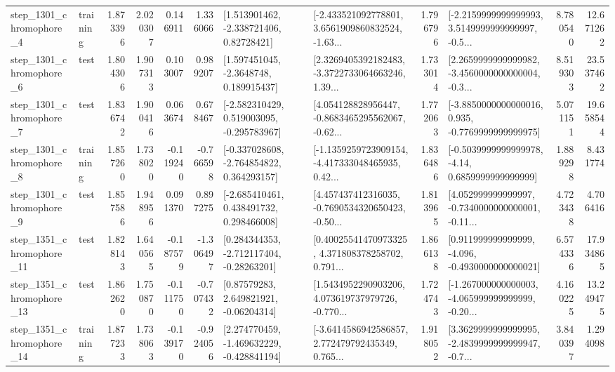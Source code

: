 \begin{tabular}{llrrrrllrlrr}
  step\_1301\_chromophore\_4 &  training &      1.873396 &    2.020307 &      0.146911 &  1.336066 &     [1.513901462, -2.338721406, 0.82728421] &  [-2.433521092778801, 3.6561909860832524, -1.63... &       1.796796 &  [-2.2159999999999993, 3.5149999999999997, -0.5... &            8.780540 &         12.671262 \\
  step\_1301\_chromophore\_6 &      test &      1.804306 &    1.907313 &      0.103007 &  0.989207 &      [1.597451045, -2.3648748, 0.189915437] &  [2.3269405392182483, -3.3722733064663246, 1.39... &       1.733014 &  [2.2659999999999982, -3.4560000000000004, -0.3... &            8.519303 &         23.537462 \\
  step\_1301\_chromophore\_7 &      test &      1.836742 &    1.900416 &      0.063674 &  0.678467 &   [-2.582310429, 0.519003095, -0.295783967] &  [4.054128828956447, -0.8683465295562067, -0.62... &       1.772063 &  [-3.8850000000000016, 0.935, -0.7769999999999975] &            5.071151 &         19.658544 \\
  step\_1301\_chromophore\_8 &  training &      1.857260 &    1.738020 &     -0.119240 & -0.766598 &   [-0.337028608, -2.764854822, 0.364293157] &  [-1.1359259723909154, -4.417333048465935, 0.42... &       1.836486 &   [-0.5039999999999978, -4.14, 0.6859999999999999] &            1.889298 &          8.431774 \\
  step\_1301\_chromophore\_9 &      test &      1.857586 &    1.948956 &      0.091370 &  0.897275 &    [-2.685410461, 0.438491732, 0.298466008] &  [4.457437412316035, -0.7690534320650423, -0.50... &       1.813965 &  [4.052999999999997, -0.7340000000000001, -0.11... &            4.723438 &          4.706416 \\
 step\_1351\_chromophore\_11 &      test &      1.828143 &    1.640565 &     -0.187579 & -1.306497 &    [0.284344353, -2.712117404, -0.28263201] &  [0.40025541470973325, 4.371808378258702, 0.791... &       1.866138 &   [0.911999999999999, -4.096, -0.4930000000000021] &            6.574336 &         17.934865 \\
 step\_1351\_chromophore\_13 &      test &      1.862620 &    1.750870 &     -0.111750 & -0.707432 &      [0.87579283, 2.649821921, -0.06204314] &  [1.5434952290903206, 4.073619737979726, -0.770... &       1.724743 &  [-1.267000000000003, -4.065999999999999, -0.20... &            4.160225 &         13.249475 \\
 step\_1351\_chromophore\_14 &  training &      1.877233 &    1.738063 &     -0.139170 & -0.924056 &   [2.274770459, -1.469632229, -0.428841194] &  [-3.6414586942586857, 2.772479792435349, 0.765... &       1.918052 &  [3.3629999999999995, -2.4839999999999947, -0.7... &            3.840397 &          1.294098 \\

\end{tabular}
